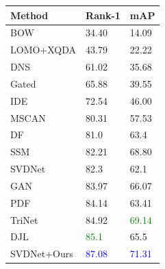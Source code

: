 \documentclass[10pt,twocolumn,letterpaper]{article}
\begin{document}
\begin{table}
\small
\begin{center}
%
%
\begin{tabularx}{\linewidth}{ l|C|C }
\hline
Method & Rank-1 & mAP \\
\hline
\hline
{BOW}  \cite{zheng2015scalable}  & 34.40 & 14.09 \\
LOMO+XQDA \cite{liao2015lomo} & 43.79 & 22.22 \\
DNS \cite{zhang2016learningDNS}  & 61.02 & 35.68 \\
Gated \cite{varior2016gated}  & 65.88 & 39.55 \\
IDE \cite{reid-survey} & 72.54 & 46.00\\
MSCAN \cite{li2017learning} & 80.31 & 57.53\\
DF \cite{zhao2017deeply} & 81.0 & 63.4 \\
SSM \cite{bai2017scalable} & 82.21 & 68.80 \\
{SVDNet} \cite{sun2017svdnet} & 82.3 & 62.1 \\
{GAN} \cite{zheng2017unlabeled} & 83.97 & 66.07 \\
PDF \cite{su2017pose}  & 84.14 & 63.41 \\
TriNet \cite{hermans2017defense} & 84.92 & \textcolor{green}{69.14} \\
DJL \cite{li2017person} & \textcolor{green}{85.1} & 65.5\\
\hline
\hline
SVDNet+Ours&  \textcolor{blue}{87.08}& \textcolor{blue}{71.31} \\

\end{tabularx}
\end{center}
\end{table}
\end{document}
